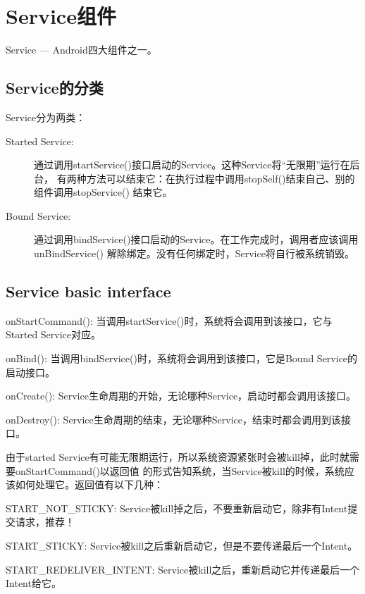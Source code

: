 ﻿
\section[Service组件]{Service组件}
Service --- Android四大组件之一。

\subsection[Service的分类]{Service的分类}
Service分为两类：\par
\begin{description}
  \item[Started Service:] 通过调用startService()接口启动的Service。这种Service将“无限期”运行在后台，
                          有两种方法可以结束它：在执行过程中调用stopSelf()结束自己、别的组件调用stopService() 结束它。
  \item[Bound Service:] 通过调用bindService()接口启动的Service。在工作完成时，调用者应该调用unBindService()
                        解除绑定。没有任何绑定时，Service将自行被系统销毁。
\end{description}

\subsection[Service basic interface]{Service basic interface}
\begin{coloredenumerate}
  \item onStartCommand(): 当调用startService()时，系统将会调用到该接口，它与Started Service对应。
  \item onBind(): 当调用bindService()时，系统将会调用到该接口，它是Bound Service的启动接口。
  \item onCreate(): Service生命周期的开始，无论哪种Service，启动时都会调用该接口。
  \item onDestroy(): Service生命周期的结束，无论哪种Service，结束时都会调用到该接口。
\end{coloredenumerate}

由于started Service有可能无限期运行，所以系统资源紧张时会被kill掉，此时就需要onStartCommand()以返回值
的形式告知系统，当Service被kill的时候，系统应该如何处理它。返回值有以下几种：\par
\begin{coloredenumerate}
  \item START\_NOT\_STICKY: Service被kill掉之后，不要重新启动它，除非有Intent提交请求，推荐！
  \item START\_STICKY: Service被kill之后重新启动它，但是不要传递最后一个Intent。
  \item START\_REDELIVER\_INTENT: Service被kill之后，重新启动它并传递最后一个Intent给它。
\end{coloredenumerate}

